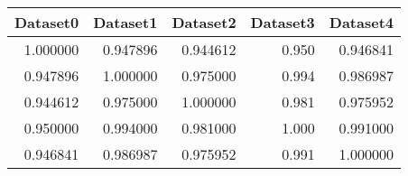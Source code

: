 \begin{tabular}{rrrrr}
\toprule
 Dataset0 &  Dataset1 &  Dataset2 &  Dataset3 &  Dataset4 \\
\midrule
 1.000000 &  0.947896 &  0.944612 &     0.950 &  0.946841 \\
 0.947896 &  1.000000 &  0.975000 &     0.994 &  0.986987 \\
 0.944612 &  0.975000 &  1.000000 &     0.981 &  0.975952 \\
 0.950000 &  0.994000 &  0.981000 &     1.000 &  0.991000 \\
 0.946841 &  0.986987 &  0.975952 &     0.991 &  1.000000 \\
\bottomrule
\end{tabular}
